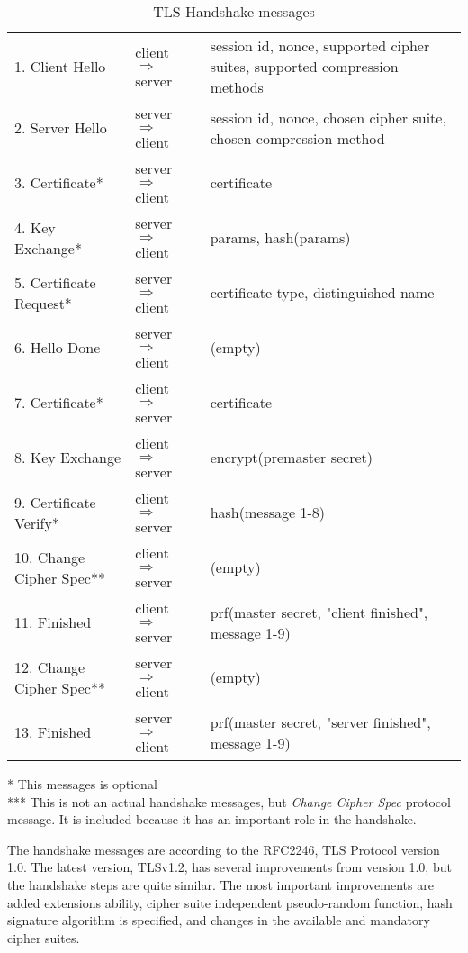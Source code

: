 \documentclass[12pt,a4paper,titlepage]{report}
\begin{document}
\begin{table}[H]
\centering
\caption{TLS Handshake messages}
\label{TLS Handshake messages}
\begin{small}
\begin{tabular}{ l | l | p{9cm} }
\hline
1. Client Hello & client $\Rightarrow$ server & session id, nonce, supported cipher suites, supported compression methods\\
2. Server Hello & server $\Rightarrow$ client & session id, nonce, chosen cipher suite, chosen compression method\\
3. Certificate* & server $\Rightarrow$ client & certificate\\
4. Key Exchange* & server $\Rightarrow$ client & params, hash(params)\\
5. Certificate Request* & server $\Rightarrow$ client & certificate type, distinguished name\\
6. Hello Done & server $\Rightarrow$ client & (empty)\\
7. Certificate* & client $\Rightarrow$ server & certificate\\
8. Key Exchange & client $\Rightarrow$ server & encrypt(premaster secret)\\
9. Certificate Verify* & client $\Rightarrow$ server & hash(message 1-8)\\
10. Change Cipher Spec** & client $\Rightarrow$ server & (empty)\\
11. Finished & client $\Rightarrow$ server & prf(master secret, "client finished", message 1-9)\\
12. Change Cipher Spec** & server $\Rightarrow$ client & (empty)\\
13. Finished & server $\Rightarrow$ client & prf(master secret, "server finished", message 1-9)\\
\hline
\end{tabular}
\end{small}
\end{table}
* This messages is optional\\
*** This is not an actual handshake messages, but \emph{Change Cipher Spec} protocol message. It is included because it has an important role in the handshake.

The handshake messages are according to the RFC2246\cite{rfc2246}, TLS Protocol version 1.0. The latest version, TLSv1.2, has several improvements from version 1.0, but the handshake steps are quite similar. The most important improvements are added extensions ability, cipher suite independent pseudo-random function, hash signature algorithm is specified, and changes in the available and mandatory cipher suites. \cite{rfc5246}
\end{document}
